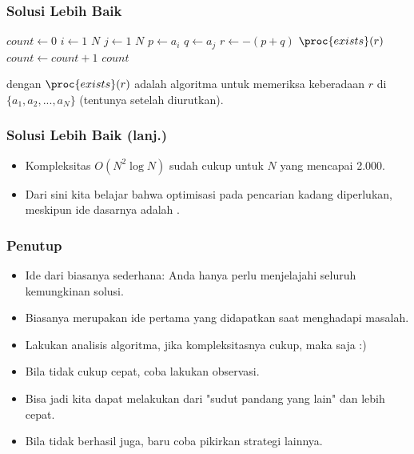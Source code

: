 \begin{frame}
\frametitle{Solusi Lebih Baik}
\begin{codebox}
\li $count \gets 0$
\li \For $i \gets 1$ \To $N$ \Do
\li   \For $j \gets 1$ \To $N$ \Do
\li       $p \gets a_i$
\li       $q \gets a_j$
\li       $r \gets -(p + q)$
\li       \If $\proc{exists}(r)$ \Then
\li         $count \gets count + 1$
          \End
        \End
      \End
    \End
\li \Return $count$
\end{codebox}

dengan $\proc{exists}(r)$ adalah algoritma \fBinarySearch untuk memeriksa keberadaan $r$ di $\{ a_1, a_2, ..., a_N \}$ (tentunya setelah diurutkan).
\end{frame}

\begin{frame}
\frametitle{Solusi Lebih Baik (lanj.)}
\begin{itemize}
  \item Kompleksitas $O(N^2 \log{N})$ sudah cukup untuk $N$ yang mencapai 2.000.
  \item Dari sini kita belajar bahwa optimisasi pada pencarian kadang diperlukan, meskipun ide dasarnya adalah \fbruteForce.
\end{itemize}
\end{frame}

\begin{frame}
\frametitle{Penutup}
\begin{itemize}
  \item Ide dari \fbruteForce biasanya sederhana: Anda hanya perlu menjelajahi seluruh kemungkinan solusi.
  \item Biasanya merupakan ide pertama yang didapatkan saat menghadapi masalah.
  \item Lakukan analisis algoritma, jika kompleksitasnya cukup, maka \fbruteForce saja :)
  \item Bila tidak cukup cepat, coba lakukan observasi. 
  \item Bisa jadi kita dapat melakukan \fbruteForce dari "sudut pandang yang lain" dan lebih cepat.
  \item Bila tidak berhasil juga, baru coba pikirkan strategi lainnya.
\end{itemize}
\end{frame}


